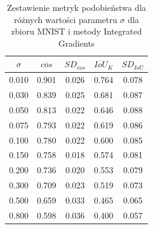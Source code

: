 \begin{table}[H]
    \centering
    \caption{Zestawienie metryk podobieństwa dla różnych wartości parametru \(\sigma\) dla zbioru MNIST i metody Integrated Gradients}
    \label{tab:ig_sg_cos_topk_mnist}
    \begin{tabular}{ccccc}
    \toprule
    $\sigma$ & $\overline{cos}$ & $SD_{cos}$ & $\overline{IoU}_{K}$ & $SD_{IoU}$ \\
    \midrule
    0.010 & 0.901 & 0.026 & 0.764 & 0.078 \\
    0.030 & 0.839 & 0.025 & 0.681 & 0.087 \\
    0.050 & 0.813 & 0.022 & 0.646 & 0.088 \\
    0.075 & 0.793 & 0.022 & 0.619 & 0.086 \\
    0.100 & 0.780 & 0.022 & 0.600 & 0.085 \\
    0.150 & 0.758 & 0.018 & 0.574 & 0.081 \\
    0.200 & 0.736 & 0.020 & 0.553 & 0.079 \\
    0.300 & 0.709 & 0.023 & 0.519 & 0.073 \\
    0.500 & 0.659 & 0.033 & 0.465 & 0.065 \\
    0.800 & 0.598 & 0.036 & 0.400 & 0.057 \\
    \bottomrule
    \end{tabular}
\end{table}

